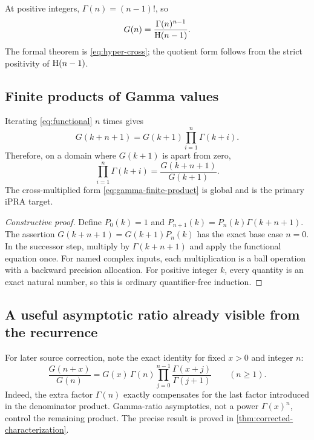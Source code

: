 At positive integers, \(\Gamma(n)=(n-1)!\), so
\begin{equation}\label{eq:G-over-H}
 G(n)=\frac{\Gamma(n)^{n-1}}{\operatorname{H}(n-1)}.
\end{equation}
The formal theorem is \cref{eq:hyper-cross}; the quotient form follows from the
strict positivity of \(\operatorname{H}(n-1)\).

\subsection{Finite products of Gamma values}

Iterating \cref{eq:functional} \(n\) times gives
\begin{equation}\label{eq:gamma-finite-product}
 G(k+n+1)=G(k+1)\prod_{i=1}^{n}\Gamma(k+i).
\end{equation}
Therefore, on a domain where \(G(k+1)\) is apart from zero,
\begin{equation}\label{eq:gamma-finite-quotient}
 \prod_{i=1}^{n}\Gamma(k+i)
 =\frac{G(k+n+1)}{G(k+1)}.
\end{equation}
The cross-multiplied form \cref{eq:gamma-finite-product} is global and is the
primary iPRA target.

\begin{proof}[Constructive proof]
Define
\(P_0(k)=1\) and
\(P_{n+1}(k)=P_n(k)\Gamma(k+n+1)\).  The assertion
\(G(k+n+1)=G(k+1)P_n(k)\) has the exact base case \(n=0\).  In the successor
step, multiply by \(\Gamma(k+n+1)\) and apply the functional equation once.
For named complex inputs, each multiplication is a ball operation with a
backward precision allocation.  For positive integer \(k\), every quantity is
an exact natural number, so this is ordinary quantifier-free induction.
\end{proof}

\subsection{A useful asymptotic ratio already visible from the recurrence}

For later source correction, note the exact identity for fixed \(x>0\) and
integer \(n\):
\begin{equation}\label{eq:ratio-exact}
 \frac{G(n+x)}{G(n)}
 =G(x)\,\Gamma(n)
   \prod_{j=0}^{n-1}\frac{\Gamma(x+j)}{\Gamma(j+1)}
 \qquad(n\ge1).
\end{equation}
Indeed, the extra factor \(\Gamma(n)\) exactly compensates for the last
factor introduced in the denominator product.  Gamma-ratio asymptotics, not a
power \(\Gamma(x)^n\), control the remaining product.
The precise result is proved in \cref{thm:corrected-characterization}.
